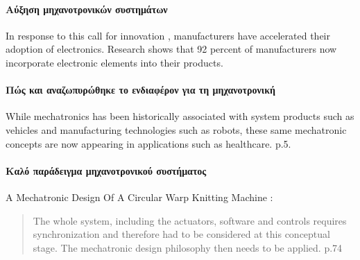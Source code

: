 \documentclass[a4paper,12pt,twoside]{report}
\begin{document}
{			\paragraph{Αύξηση μηχανοτρονικών συστημάτων}{In response to this call for innovation \cite{MasteringnnovationExploitingIdeasForProfitableGrowth;Deloitte2005}, manufacturers have accelerated their adoption of electronics. Research shows that 92 percent of manufacturers now incorporate electronic elements into their products. \cite{TheMechatronicsSystemDesignBenchmarkReportCoordinatingEngineeringDisciplines}
			}
			
			\paragraph{Πώς και αναζωπυρώθηκε το ενδιαφέρον για τη μηχανοτρονική}{While mechatronics has been historically associated with system products such as vehicles and manufacturing technologies such as robots, these same mechatronic concepts are now appearing in applications such as healthcare. \cite{MechatronicsInActionCaseStudiesInMechatronics:Bradley2010} p.5.			
			}
			
			
			
			\paragraph{Καλό παράδειγμα μηχανοτρονικού συστήματος} {A Mechatronic Design Of A Circular Warp Knitting Machine : 
			\begin{quote}
			The whole system, including the actuators, software and controls requires synchronization and therefore had to be considered at this conceptual stage. The mechatronic design philosophy then needs to be applied. \cite{AMechatronicDesignOfACircularWarpKnittingMachine:Acar2011} p.74
			\end{quote}
			}
			
}
\end{document}
